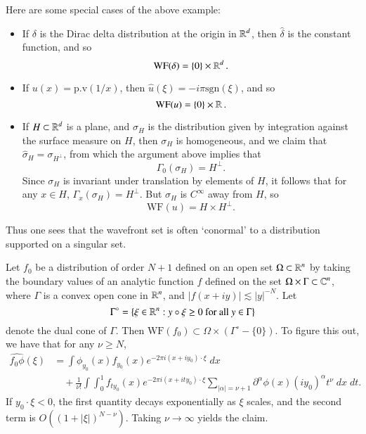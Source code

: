   Here are some special cases of the above example:
  \begin{itemize}
    \item If $\delta$ is the Dirac delta distribution at the origin in $\operatorname{\mathbb{R}}^d$, then $\widehat{\delta}$ is the constant function, and so
    \[ \text{WF}(\delta) = \{ 0 \} \times \operatorname{\mathbb{R}}^d. \]

    \item If $u(x) = \text{p.v}(1/x)$, then $\widehat{u}(\xi) = -i \pi \text{sgn}(\xi)$, and so
    \[ \text{WF}(u) = \{ 0 \} \times \operatorname{\mathbb{R}}. \]

    \item If $H \subset \operatorname{\mathbb{R}}^d$ is a plane, and $\sigma_H$ is the distribution given by integration against the surface measure on $H$, then $\sigma_H$ is homogeneous, and we claim that $\widehat{\sigma}_H = \sigma_{H^\perp}$, from which the argument above implies that
    \[ \Gamma_0(\sigma_H) = H^\perp. \]
    Since $\sigma_H$ is invariant under translation by elements of $H$, it follows that for any $x \in H$, $\Gamma_x(\sigma_H) = H^\perp$. But $\sigma_H$ is $C^\infty$ away from $H$, so
    \[ \text{WF}(u) = H \times H^\perp. \]
  \end{itemize}
  Thus one sees that the wavefront set is often `conormal' to a distribution supported on a singular set.

\begin{example}
    Let $f_0$ be a distribution of order $N+1$ defined on an open set $\Omega \subset \operatorname{\mathbb{R}}^n$ by taking the boundary values of an analytic function $f$ defined on the set $\Omega \times \Gamma \subset \operatorname{\mathbb{C}}^n$, where $\Gamma$ is a convex open cone in $\operatorname{\mathbb{R}}^n$, and $|f(x + iy)| \lesssim |y|^{-N}$. Let
    \[ \Gamma^\circ = \{ \xi \in \operatorname{\mathbb{R}}^n: y \circ \xi \geq 0\ \text{for all $y \in \Gamma$} \} \]
    denote the dual cone of $\Gamma$. Then $\text{WF}(f_0) \subset \Omega \times (\Gamma^\circ - \{ 0 \})$. To figure this out, we have that for any $\nu \geq N$,
    \begin{align*}
        \widehat{f_0 \phi}(\xi) &= \int \phi_{y_0}(x) f_{y_0}(x) e^{-2 \pi i (x + i y_0) \cdot \xi}\; dx\\
        &\quad + \frac{1}{\nu!} \int \int_0^1 f_{ty_0}(x) e^{-2 \pi i (x + i ty_0) \cdot \xi} \sum_{|\alpha| = \nu + 1} \partial^\alpha \phi(x) (i y_0)^\alpha t^\nu\; dx\; dt.
    \end{align*}
    If $y_0 \cdot \xi < 0$, the first quantity decays exponentially as $\xi$ scales, and the second term is $O((1 + |\xi|)^{N-\nu})$. Taking $\nu \to \infty$ yields the claim.
\end{example}

